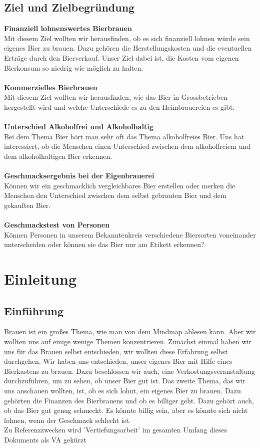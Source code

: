 \subsection{Ziel und Zielbegründung}
\textbf{Finanziell lohnenswertes Bierbrauen}\\
Mit diesem Ziel wollten wir herausfinden, ob es sich finanziell lohnen würde sein eigenes Bier zu brauen. Dazu gehören die Herstellungskosten und die eventuellen Erträge durch den Bierverkauf. Unser Ziel dabei ist, die Kosten vom eigenen Bierkonsum so niedrig wie möglich zu halten.
\\\\\textbf{Kommerzielles Bierbrauen}\\
Mit diesem Ziel wollten wir herausfinden, wie das Bier in Grossbetrieben hergestellt wird und welche Unterschiede es zu den Heimbrauereien es gibt.
\\\\\textbf{Unterschied Alkoholfrei und Alkoholhaltig}\\
Bei dem Thema Bier hört man sehr oft das Thema alkoholfreies Bier. Uns hat interessiert, ob die Menschen einen Unterschied zwischen dem alkoholfreiem und dem alkoholhaltigen Bier erkennen. 
\\\\\textbf{Geschmacksergebnis bei der Eigenbrauerei}\\
Können wir ein geschmacklich vergleichbares Bier erstellen oder merken die Menschen den Unterschied zwischen dem selbst gebrauten Bier und dem gekauften Bier.
\\\\\textbf{Geschmackstest von Personen}\\
Können Personen in unserem Bekanntenkreis verschiedene Biersorten voneinander unterscheiden oder können sie das Bier nur am Etikett erkennen?

\newpage
\section{Einleitung}
\subsection{Einführung}
Brauen ist ein großes Thema, wie man von dem Mindmap ablesen kann. 
Aber wir wollten uns auf einige wenige Themen konzentrieren.
Zunächst einmal haben wir uns für das Brauen selbst entschieden, 
wir wollten diese Erfahrung selbst durchgehen. Wir haben uns entschieden,
unser eigenes Bier mit Hilfe eines Bierkastens zu brauen. Dazu beschlossen wir auch,
eine Verkostungsveranstaltung durchzuführen, um zu sehen, ob unser Bier gut ist. 
Das zweite Thema, das wir uns anschauen wollten, ist, ob es sich lohnt, ein eigenes Bier zu brauen. Dazu gehörten die Finanzen des Bierbrauens und ob es billiger geht. Dazu gehört auch, ob das Bier gut genug schmeckt. Es könnte billig sein, aber es könnte sich nicht lohnen, wenn der Geschmack schlecht ist.
\\
Zu Referenzzwecken wird 'Vertiefungsarbeit' im gesamten Umfang dieses Dokuments als VA gekürzt
\newpage

